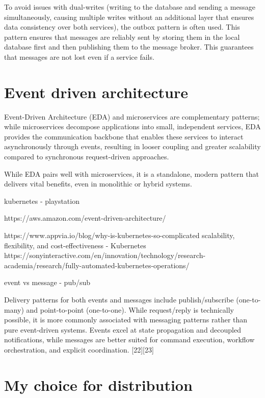 \documentclass[]{final}
\begin{document}
To avoid issues with dual-writes (writing to the database and sending a message
simultaneously, causing multiple writes without an additional layer that
ensures data consistency over both services), the outbox pattern is often used.
This pattern ensures that messages are reliably sent by storing them in the
local database first and then publishing them to the message broker. This
guarantees that messages are not lost even if a service fails.

\section{Event driven architecture}

Event-Driven Architecture (EDA) and microservices are complementary patterns;
while microservices decompose applications into small, independent services,
EDA provides the communication backbone that enables these services to
interact asynchronously through events, resulting in looser coupling and
greater scalability compared to synchronous request-driven approaches.

While EDA pairs well with microservices, it is a standalone, modern
pattern that delivers vital benefits, even in monolithic or hybrid systems.

kubernetes - playstation

https://aws.amazon.com/event-driven-architecture/

https://www.appvia.io/blog/why-is-kubernetes-so-complicated
scalability, flexibility, and cost-effectiveness - Kubernetes
https://sonyinteractive.com/en/innovation/technology/research-academia/research/fully-automated-kubernetes-operations/

event vs message - pub/sub

Delivery patterns for both events and messages include publish/subscribe
(one-to-many) and point-to-point (one-to-one). While request/reply is
technically possible, it is more commonly associated with messaging patterns
rather than pure event-driven systems. Events excel at state propagation
and decoupled notifications, while messages are better suited for command
execution, workflow orchestration, and explicit coordination. [22][23]

\section{My choice for distribution}
\end{document}
